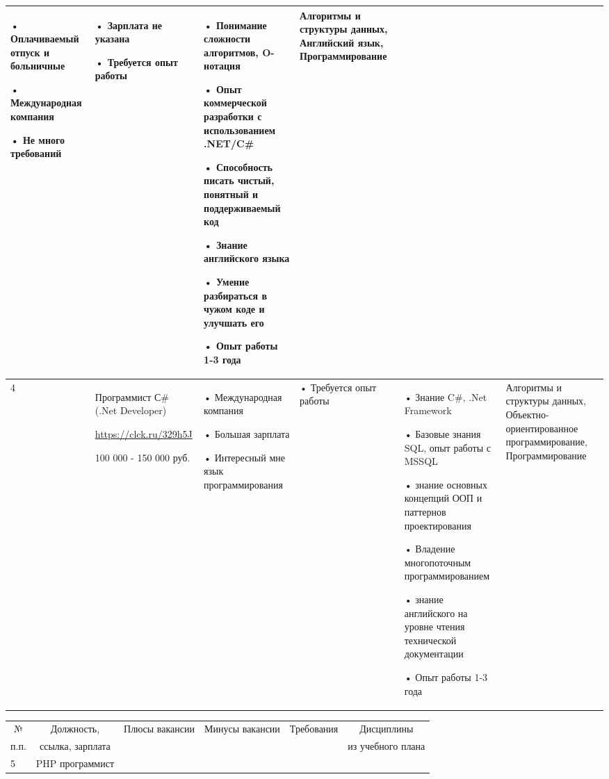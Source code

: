 \begin{landscape}
\begin{table}[H]
\begin{center}
\begin{small}
\begin{tabular}{|p{0.1cm}|p{5cm}|p{4.5cm}|p{4.5cm}|p{4cm}|p{3cm}|}
				• Оплачиваемый отпуск и больничные
				
				• Международная компания
				
				• Не много требований 
				&
				• Зарплата не указана
				
				• Требуется опыт работы 
				&
				• Понимание сложности алгоритмов, O-нотация
				
				• Опыт коммерческой разработки с использованием .NET/C\#
				
				• Способность писать чистый, понятный и поддерживаемый код
				
				• Знание английского языка
				
				• Умение разбираться в чужом коде и улучшать его
				
				• Опыт работы 1-3 года 
				&
				Алгоритмы и структуры данных, Английский язык, Программирование
				\\
				\hline
				4 & Программист С\# (.Net Developer)
				
				\url{https://clck.ru/329h5J}
				
				100 000 - 150 000 руб. &
				• Международная компания
				
				• Большая зарплата
				
				• Интересный мне язык программирования
				&
				• Требуется опыт работы
				&
				• Знание C\#‚ .Net Framework
				 
				• Базовые знания SQL, опыт работы с MSSQL
				
				• знание основных концепций ООП и паттернов проектирования
				
				• Владение многопоточным программированием
				
				• знание английского на уровне чтения технической документации
				
				• Опыт работы 1-3 года 
				&
				Алгоритмы и структуры данных, Объектно-ориентированное программирование, Программирование
				\\
				\hline
			\end{tabular}
		\end{small}
	\end{center}
\end{table}


\begin{table}[H]
	\begin{center}
		\begin{small}
		\begin{tabular}{|p{0.1cm}|p{5cm}|p{4.5cm}|p{4.5cm}|p{4cm}|p{3cm}|} \hline
			\multicolumn{1}{|c|}{№}&\multicolumn{1}{c|}{Должность,}&\multicolumn{1}{c|}{Плюсы вакансии}&\multicolumn{1}{c|}{Минусы вакансии}&\multicolumn{1}{c|}{Требования}&\multicolumn{1}{c|}{Дисциплины}\\ 
			\multicolumn{1}{|c|}{п.п.}&\multicolumn{1}{c|}{ссылка, зарплата}&\multicolumn{1}{c|}{}&\multicolumn{1}{c|}{}&\multicolumn{1}{c|}{}&\multicolumn{1}{c|}{из учебного плана}\\ 
			\hline	
			5 & PHP программист
				

\end{tabular}
\end{small}
\end{center}
\end{table}
\end{landscape}
